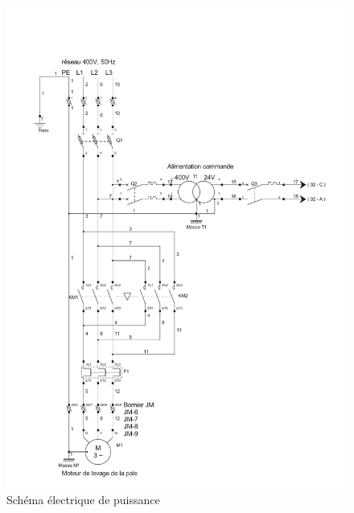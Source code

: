 \begin{figure}[!h]
\begin{center}
\includegraphics[width=0.9\linewidth]{img/schema1.pdf}
\caption{Schéma électrique de puissance}
\label{fig:image14}
\end{center}
\end{figure}

\newpage

